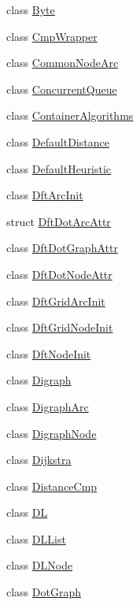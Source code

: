 \begin{DoxyCompactItemize}
class \hyperlink{class_designar_1_1_byte}{Byte}
\item 
class \hyperlink{class_designar_1_1_cmp_wrapper}{Cmp\+Wrapper}
\item 
class \hyperlink{class_designar_1_1_common_node_arc}{Common\+Node\+Arc}
\item 
class \hyperlink{class_designar_1_1_concurrent_queue}{Concurrent\+Queue}
\item 
class \hyperlink{class_designar_1_1_container_algorithms}{Container\+Algorithms}
\item 
class \hyperlink{class_designar_1_1_default_distance}{Default\+Distance}
\item 
class \hyperlink{class_designar_1_1_default_heuristic}{Default\+Heuristic}
\item 
class \hyperlink{class_designar_1_1_dft_arc_init}{Dft\+Arc\+Init}
\item 
struct \hyperlink{struct_designar_1_1_dft_dot_arc_attr}{Dft\+Dot\+Arc\+Attr}
\item 
class \hyperlink{class_designar_1_1_dft_dot_graph_attr}{Dft\+Dot\+Graph\+Attr}
\item 
class \hyperlink{class_designar_1_1_dft_dot_node_attr}{Dft\+Dot\+Node\+Attr}
\item 
class \hyperlink{class_designar_1_1_dft_grid_arc_init}{Dft\+Grid\+Arc\+Init}
\item 
class \hyperlink{class_designar_1_1_dft_grid_node_init}{Dft\+Grid\+Node\+Init}
\item 
class \hyperlink{class_designar_1_1_dft_node_init}{Dft\+Node\+Init}
\item 
class \hyperlink{class_designar_1_1_digraph}{Digraph}
\item 
class \hyperlink{class_designar_1_1_digraph_arc}{Digraph\+Arc}
\item 
class \hyperlink{class_designar_1_1_digraph_node}{Digraph\+Node}
\item 
class \hyperlink{class_designar_1_1_dijkstra}{Dijkstra}
\item 
class \hyperlink{class_designar_1_1_distance_cmp}{Distance\+Cmp}
\item 
class \hyperlink{class_designar_1_1_d_l}{DL}
\item 
class \hyperlink{class_designar_1_1_d_l_list}{D\+L\+List}
\item 
class \hyperlink{class_designar_1_1_d_l_node}{D\+L\+Node}
\item 
class \hyperlink{class_designar_1_1_dot_graph}{Dot\+Graph}
\item 

\end{DoxyCompactItemize}
